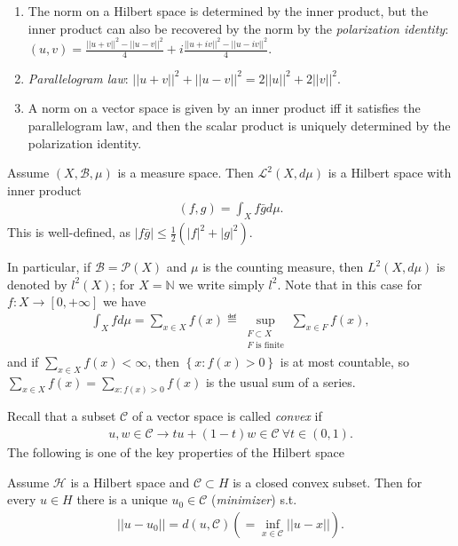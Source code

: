 \begin{enumerate}
    \item The norm on a Hilbert space is determined by the inner product, but the inner product can also be recovered by the norm by the 
    \emph{polarization identity}: \((u,v) = \frac{||u+v||^2 - ||u-v||^2}{4}+ i\frac{||u+iv||^2 - ||u-iv||^2}{4}\).
    \item \emph{Parallelogram law}: \(||u+v||^2 + ||u-v||^2 = 2||u||^2 + 2||v||^2\).
    \item A norm on a vector space is given by an inner product iff it satisfies the parallelogram law, and then the scalar product is 
    uniquely determined by the polarization identity. 
\end{enumerate}
\ifdetailed
\begin{example}
    Assume \(\left(X,\mathscr{B}, \mu\right)\) is a measure space. Then \(\mathcal{L}^2(X,d\mu)\) is a Hilbert space with inner product
    \begin{align*}
        (f,g) = \int_X f\bar{g}d\mu.
    \end{align*}
    This is well-defined, as \(|f\bar{g}|\leq \frac{1}{2}(|f|^2 + |g|^2)\). 

    In particular, if \(\mathscr{B} = \mathcal{P}(X)\) and \(\mu\) is the counting measure, then \(L^2(X,d\mu)\) is denoted by \(l^2(X)\);
    for \(X=\mathbb{N}\) we write simply \(l^2\). Note that in this case for \(f:X\rightarrow [0,+\infty]\) we have
    \begin{align*}
        \int_X fd\mu = \sum\limits_{x\in X} f(x) \eqdef \sup\limits_{\substack{F\subset X \\ F\text{ is finite}}} \sum\limits_{x\in F} f(x),
    \end{align*}
    and if \(\sum_{x\in X}f(x)<\infty\), then \(\left\{x:f(x)>0\right\}\) is at most countable, so \(\sum_{x\in X}f(x) = \sum_{x:f(x)>0}f(x)\)
    is the usual sum of a series. 
\end{example}
\fi
Recall that a subset \(\mathcal{C}\) of a vector space is called \emph{convex} if 
\begin{align*}
    u,w\in\mathcal{C} \rightarrow tu + (1-t)w\in\mathcal{C} \ \forall t\in(0,1).
\end{align*}
The following is one of the key properties of the Hilbert space
\begin{theorem}
    Assume \(\mathcal{H}\) is a Hilbert space and \(\mathcal{C}\subset H\) is a closed convex subset. Then for every \(u\in H\) there is a unique 
    \(u_0\in\mathcal{C}\) (\emph{minimizer}) s.t.
    \begin{align*}
        ||u-u_0|| = d(u,\mathcal{C})(=\inf\limits_{x\in\mathcal{C}} ||u-x||).
    \end{align*}
\end{theorem}
